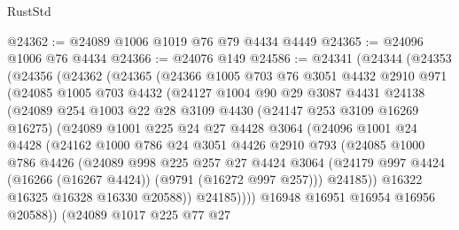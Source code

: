 \begin{lexlean}{RustStd}
\begin{coremodule}
@24362 := @24089 @1006 @1019 @76 @79 @4434 @4449
@24365 := @24096 @1006 @76 @4434
@24366 := @24076 @149
@24586 := @24341
    (@24344
      (@24353
        (@24356
          (@24362
            (@24365
              (@24366
                @1005
                @703
                @76
                @3051
                @4432
                @2910
                @971
                (@24085
                  @1005
                  @703
                  @4432
                  (@24127
                    @1004
                    @90
                    @29
                    @3087
                    @4431
                    @24138
                    (@24089
                      @254
                      @1003
                      @22
                      @28
                      @3109
                      @4430
                      (@24147 @253 @3109 @16269 @16275)
                      (@24089
                        @1001
                        @225
                        @24
                        @27
                        @4428
                        @3064
                        (@24096
                          @1001
                          @24
                          @4428
                          (@24162
                            @1000
                            @786
                            @24
                            @3051
                            @4426
                            @2910
                            @793
                            (@24085
                              @1000
                              @786
                              @4426
                              (@24089
                                @998
                                @225
                                @257
                                @27
                                @4424
                                @3064
                                (@24179
                                  @997
                                  @4424
                                  (@16266 (@16267 @4424))
                                  (@9791 (@16272 @997 @257)))
                                @24185))
                            @16322
                            @16325
                            @16328
                            @16330
                            @20588))
                        @24185))))
                @16948
                @16951
                @16954
                @16956
                @20588))
            (@24089
              @1017
              @225
              @77
              @27

\end{coremodule}
\end{lexlean}
